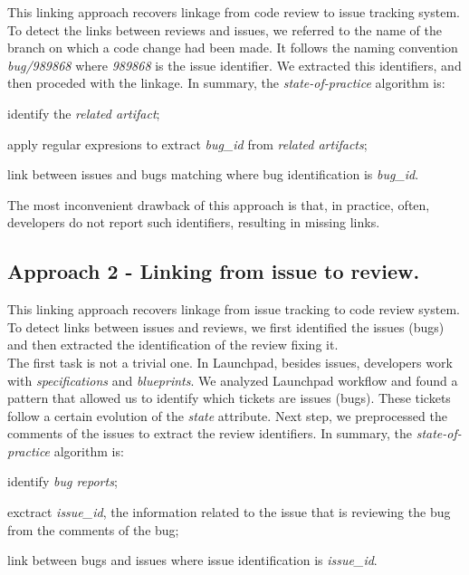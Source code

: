 \documentclass[conference,compsoc]{IEEEtran}
\begin{document}
This linking approach recovers linkage from code review to issue tracking system. 
To detect the links between reviews and issues, we referred to the name of 
the branch on which a code change had been made. It follows the naming convention 
\emph{bug/989868} where \emph{989868} is the issue identifier. 
We extracted this identifiers, and then proceded with the linkage. 
In summary, the \emph{state-of-practice} algorithm is:
\\
\begin{list}{}{}

\item[$\space$] identify the \emph{related artifact};

apply regular expresions to extract \emph{bug\_id} from \emph{related artifacts};

link between issues and bugs matching where bug identification is \emph{bug\_id}.\\

\end{list}

The most inconvenient drawback of this approach is that, in practice, often, developers 
do not report such identifiers, resulting in missing links.

\subsection{Approach 2 - Linking from issue to review.}
This linking approach recovers linkage from issue tracking 
to code review system. To detect links between issues and reviews, we first identified 
the issues (bugs) and then extracted the identification of the review fixing it.
\\
The first task is not a trivial one. In Launchpad, besides issues, 
developers work with \textit{specifications} and \textit{blueprints}. 
We analyzed Launchpad workflow and found a pattern that allowed us 
to identify which tickets are issues (bugs). These tickets follow a certain 
evolution of the \emph{state} attribute.
Next step, we preprocessed the comments of the issues to extract the 
review identifiers.
In summary, the \emph{state-of-practice} algorithm is:
\\
\begin{list}{}{}

\item[$\space$] identify \emph{bug reports};

exctract \emph{issue\_id}, the information related to the issue that is reviewing the bug from the comments of the bug;

link between bugs and issues where issue identification is \emph{issue\_id}.\\ 

\end{list}
\end{document}

